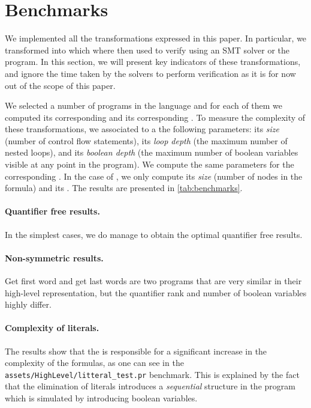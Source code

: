 \section{Benchmarks}
\label{sec:benchmarks}

We implemented all the transformations expressed in this paper. In particular,
we transformed  into  which where then used to verify 
using an SMT solver or the  program. In this section, we will present
key indicators of these transformations, and ignore the time taken by the
solvers to perform verification as it is for now out of the scope of this
paper.

We selected a number of programs in the  language
and for each of them we computed its corresponding  and
its corresponding . To measure the complexity of
these transformations, we associated to a  the
following parameters: its \emph{size} (number of control flow statements), its
\emph{loop depth} (the maximum number of nested loops), and its \emph{boolean
depth} (the maximum number of boolean variables visible at any point in the
program). We compute the same parameters for the corresponding . In the case of , we only compute
its \emph{size} (number of nodes in the formula) and its .
The results are presented in \cref{tab:benchmarks}.

\paragraph{Quantifier free results.}
In the simplest cases, we do manage to obtain the optimal quantifier
free results.

\paragraph{Non-symmetric results.} Get first word and get last words
are two programs that are very similar in their high-level
representation, but the quantifier rank and number of boolean variables
highly differ.

\paragraph{Complexity of literals.}
The results show that the  is responsible for a
significant increase in the complexity of the formulas, as one can see in the
\texttt{assets/HighLevel/litteral\_test.pr} benchmark. This is explained by the
fact that the elimination of literals introduces a \emph{sequential} structure
in the program which is simulated by introducing boolean variables.



